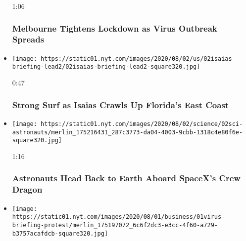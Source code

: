 \begin{itemize}
  1:06

  \hypertarget{melbourne-tightens-lockdown-as-virus-outbreak-spreads}{%
  \subsubsection{Melbourne Tightens Lockdown as Virus Outbreak
  Spreads}\label{melbourne-tightens-lockdown-as-virus-outbreak-spreads}}
\item
  \href{https://www.nytimes.com/video/us/100000007268938/isaias-florida.html?action=click\&module=video-series-bar\&region=header\&pgtype=Article\&playlistId=video/latest-video}{}

  \texttt{[image: https://static01.nyt.com/images/2020/08/02/us/02isaias-briefing-lead2/02isaias-briefing-lead2-square320.jpg]}

  0:47

  \hypertarget{strong-surf-as-isaias-crawls-up-floridas-east-coast}{%
  \subsubsection{Strong Surf as Isaias Crawls Up Florida's East
  Coast}\label{strong-surf-as-isaias-crawls-up-floridas-east-coast}}
\item
  \href{https://www.nytimes.com/video/us/100000007268936/spacex-departs-international-space-station.html?action=click\&module=video-series-bar\&region=header\&pgtype=Article\&playlistId=video/latest-video}{}

  \texttt{[image: https://static01.nyt.com/images/2020/08/02/science/02sci-astronauts/merlin\_175216431\_287c3773-da04-4003-9cbb-1318c4e80f6e-square320.jpg]}

  1:16

  \hypertarget{astronauts-head-back-to-earth-aboard-spacexs-crew-dragon}{%
  \subsubsection{Astronauts Head Back to Earth Aboard SpaceX's Crew
  Dragon}\label{astronauts-head-back-to-earth-aboard-spacexs-crew-dragon}}
\item
  \href{https://www.nytimes.com/video/world/europe/100000007268465/coronavirus-protest-germany.html?action=click\&module=video-series-bar\&region=header\&pgtype=Article\&playlistId=video/latest-video}{}

  \texttt{[image: https://static01.nyt.com/images/2020/08/01/business/01virus-briefing-protest/merlin\_175197072\_6c6f2dc3-e3cc-4f60-a729-b3757acafdcb-square320.jpg]}


\end{itemize}

